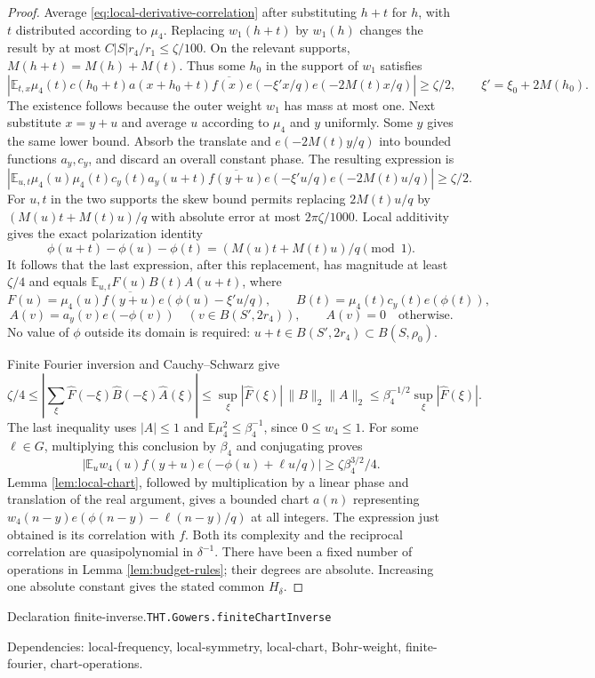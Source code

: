 \documentclass[11pt]{article}
\theoremstyle{definition}
\newcommand{\E}{\mathbb E}
\numberwithin{equation}{section}
\newcommand{\bp}[3]{\par\smallskip\begingroup\footnotesize
\noindent\hypertarget{bp:#1}{\textsf{Declaration #1.}}\quad\nolinkurl{#2}\par
\noindent\textsf{Dependencies:} #3.\par\endgroup\smallskip}
\begin{document}
\begin{proof}
Average \eqref{eq:local-derivative-correlation} after substituting $h+t$ for $h$, with $t$ distributed according to $\mu_4$. Replacing $w_1(h+t)$ by $w_1(h)$ changes the result by at most $C|S|r_4/r_1\le\zeta/100$. On the relevant supports, $M(h+t)=M(h)+M(t)$. Thus some $h_0$ in the support of $w_1$ satisfies
\[
 \left|\E_{t,x}\mu_4(t)c(h_0+t)a(x+h_0+t)
 \overline{f(x)}e(-\xi'x/q)e(-2M(t)x/q)\right|\ge\zeta/2,
 \qquad \xi'=\xi_0+2M(h_0).
\]
The existence follows because the outer weight $w_1$ has mass at most one. Next substitute $x=y+u$ and average $u$ according to $\mu_4$ and $y$ uniformly. Some $y$ gives the same lower bound. Absorb the translate and $e(-2M(t)y/q)$ into bounded functions $a_y,c_y$, and discard an overall constant phase. The resulting expression is
\[
 \left|\E_{u,t}\mu_4(u)\mu_4(t)c_y(t)a_y(u+t)
 \overline{f(y+u)}e(-\xi'u/q)e(-2M(t)u/q)\right|\ge\zeta/2.
\]
For $u,t$ in the two supports the skew bound permits replacing $2M(t)u/q$ by $(M(u)t+M(t)u)/q$ with absolute error at most $2\pi\zeta/1000$. Local additivity gives the exact polarization identity
\[
 \phi(u+t)-\phi(u)-\phi(t)=(M(u)t+M(t)u)/q\pmod1.
\]
It follows that the last expression, after this replacement, has magnitude at least $\zeta/4$ and equals $\E_{u,t}F(u)B(t)A(u+t)$, where
\[
 F(u)=\mu_4(u)\overline{f(y+u)}e(\phi(u)-\xi'u/q),\qquad
 B(t)=\mu_4(t)c_y(t)e(\phi(t)),
\]
\[
 A(v)=a_y(v)e(-\phi(v))\quad(v\in B(S',2r_4)),
 \qquad A(v)=0\quad\text{otherwise}.
\]
No value of $\phi$ outside its domain is required: $u+t\in B(S',2r_4)\subset B(S,\rho_0)$.

Finite Fourier inversion and Cauchy--Schwarz give
\[
 \zeta/4\le\left|\sum_\xi\widehat F(-\xi)\widehat B(-\xi)\widehat A(\xi)\right|
 \le\sup_\xi|\widehat F(\xi)|\,\|B\|_2\|A\|_2
 \le\beta_4^{-1/2}\sup_\xi|\widehat F(\xi)|.
\]
The last inequality uses $|A|\le1$ and $\E\mu_4^2\le\beta_4^{-1}$, since $0\le w_4\le1$. For some $\ell\in G$, multiplying this conclusion by $\beta_4$ and conjugating proves
\[
 \left|\E_u w_4(u)f(y+u)e(-\phi(u)+\ell u/q)\right|
 \ge\zeta\beta_4^{3/2}/4.
\]
Lemma \ref{lem:local-chart}, followed by multiplication by a linear phase and translation of the real argument, gives a bounded chart $a(n)$ representing $w_4(n-y)e(\phi(n-y)-\ell(n-y)/q)$ at all integers. The expression just obtained is its correlation with $f$. Both its complexity and the reciprocal correlation are quasipolynomial in $\delta^{-1}$. There have been a fixed number of operations in Lemma \ref{lem:budget-rules}; their degrees are absolute. Increasing one absolute constant gives the stated common $H_\delta$.
\end{proof}
\bp{finite-inverse}{THT.Gowers.finiteChartInverse}{local-frequency, local-symmetry, local-chart, Bohr-weight, finite-fourier, chart-operations}
\end{document}
